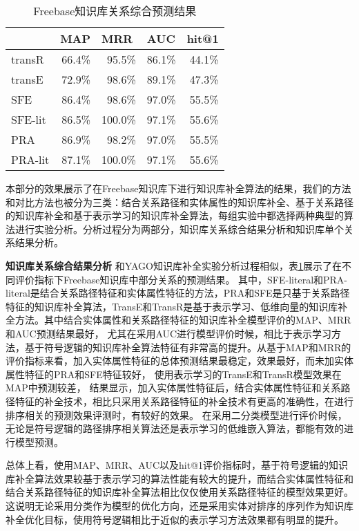 \begin{table}[htbp]
  \centering
  \caption{Freebase知识库关系综合预测结果}
    \begin{tabular}{|l|r|r|r|r|}
    \hline
          & \multicolumn{1}{l|}{MAP} & \multicolumn{1}{l|}{MRR} & \multicolumn{1}{l|}{AUC} & \multicolumn{1}{l|}{hit@1} \\
    \hline
    transR & 66.4\% & 95.5\% & 86.1\% & 44.1\% \\
    \hline
    transE & 72.9\% & 98.6\% & 89.1\% & 47.3\% \\
    \hline
    SFE   & 86.4\% & 98.6\% & 97.0\% & 55.5\% \\
    \hline
    SFE-lit & 86.5\% & 100.0\% & 97.1\% & 55.6\% \\
    \hline
    PRA   & 86.9\% & 98.2\% & 97.0\% & 55.5\% \\
    \hline
    PRA-lit & 87.1\% & 100.0\% & 97.1\% & 55.6\% \\
    \hline
    \end{tabular}%
  \label{tab:addlabel-fb}%
\end{table}%
本部分的效果展示了在Freebase知识库下进行知识库补全算法的结果，我们的方法和对比方法也被分为三类：结合关系路径和实体属性的知识库补全、基于关系路径的知识库补全和基于表示学习的知识库补全算法，每组实验中都选择两种典型的算法进行实验分析。分析过程分为两部分，知识库关系综合结果分析和知识库单个关系结果分析。

\textbf{知识库关系综合结果分析}
和YAGO知识库补全实验分析过程相似，表\ref{tab:addlabel-fb}展示了在不同评价指标下Freebase知识库中部分关系的预测结果。
其中，SFE-literal和PRA-literal是结合关系路径特征和实体属性特征的方法，PRA和SFE是只基于关系路径特征的知识库补全算法，TransE和TransR是基于表示学习、低维向量的知识库补全方法。其中结合实体属性和关系路径特征的知识库补全模型评价的MAP、MRR和AUC预测结果最好，
尤其在采用AUC进行模型评价时候，相比于表示学习方法，基于符号逻辑的知识库补全算法特征有非常高的提升。从基于MAP和MRR的评价指标来看，加入实体属性特征的总体预测结果最稳定，效果最好，而未加实体属性特征的PRA和SFE特征较好，
使用表示学习的TransE和TransR模型效果在MAP中预测较差，
结果显示，加入实体属性特征后，结合实体属性特征和关系路径特征的补全技术，相比只采用关系路径特征的补全技术有更高的准确性，在进行排序相关的预测效果评测时，有较好的效果。
在采用二分类模型进行评价时候，无论是符号逻辑的路径排序相关算法还是表示学习的低维嵌入算法，都能有效的进行模型预测。

总体上看，使用MAP、MRR、AUC以及hit@1评价指标时，基于符号逻辑的知识库补全算法效果较基于表示学习的算法性能有较大的提升，而结合实体属性特征和结合关系路径特征的知识库补全算法相比仅仅使用关系路径特征的模型效果更好。这说明无论采用分类作为模型的优化方向，还是采用实体对排序的序列作为知识库补全优化目标，使用符号逻辑相比于近似的表示学习方法效果都有明显的提升。

